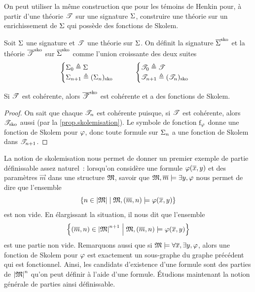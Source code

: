 On peut utiliser la même construction que pour les témoins de Henkin pour,
à partir d'une théorie $\mathscr T$ sur une signature $\Sigma$, construire une
théorie sur un enrichissement de $\Sigma$ qui possède des fonctions de Skolem.

\begin{definition}
  Soit $\Sigma$ une signature et $\mathscr T$ une théorie sur $\Sigma$. On définit
  la signature $\SkoCl{\Sign}$ et la théorie $\SkoCl{\varT}$ sur $\SkoCl{\Sign}$
  comme l'union croissante des deux suites
  \[
  \begin{cases}
    \Sigma_0 \triangleq \Sigma\\
    \Sigma_{n+1} \triangleq (\Sigma_{n})_{\operatorname{sko}}
  \end{cases}
  \qquad
  \begin{cases}
    \mathscr T_0 \triangleq \mathscr T\\
    \mathscr T_{n+1}  \triangleq (\mathscr T_n)_{\operatorname{sko}}
  \end{cases}\]
  \index[notation]{$\SkoCl{\varT}$}
  \index[notation]{$\SkoCl{\Sign}$}
\end{definition}

\begin{proposition}
  Si $\mathscr T$ est cohérente, alors $\SkoCl{\varT}$ est cohérente et a des
  fonctions de Skolem.
\end{proposition}

\begin{proof}
  On sait que chaque $\mathscr T_n$ est cohérente puisque, si $\mathscr T$ est cohérente,
  alors $\mathscr T_{\operatorname{sko}}$ aussi (par la \cref{prop.skolemisation}). Le symbole de
  fonction $\mathrm{f}_{\varphi}$ donne une fonction de Skolem pour $\varphi$, donc
  toute formule sur $\Sigma_n$ a une fonction de Skolem dans $\mathscr T_{n+1}$.
\end{proof}

La notion de skolemisation nous permet de donner un premier exemple de partie
définissable assez naturel~: lorsqu'on considère une formule $\varphi(\overline{x},y)$
et des paramètres $\vec m$ dans une structure $\mathfrak{M}$, savoir que
$\mathfrak{M},\overline{m} \models\exists y, \varphi$ nous permet de dire que l'ensemble
\[\left\{ n \in \left\vert \mathfrak{M}\right\vert \;\middle\vert\; \mathfrak{M},(\overline{m},n)\models\varphi(\overline{x},y) \right\}\]
est non vide. En élargissant la situation, il nous dit que l'ensemble
\[\left\{ (\overline{m},n)\in\left\vert \mathfrak{M}\right\vert^{n+1} \;\middle\vert\; \mathfrak{M},(\overline{m},n)\models\varphi(\overline{x},y) \right\}\]
est une partie non vide. Remarquons aussi que si
$\mathfrak{M}\models\forall \overline{x},\exists y,\varphi$, alors une fonction de Skolem
pour $\varphi$ est exactement un sous-graphe du graphe précédent qui est
fonctionnel. Ainsi, les candidats d'existence d'une formule sont des parties
de $\left\vert \mathfrak{M}\right\vert^n$ qu'on peut définir à l'aide d'une formule. \'Etudions maintenant
la notion générale de parties ainsi définissable.


